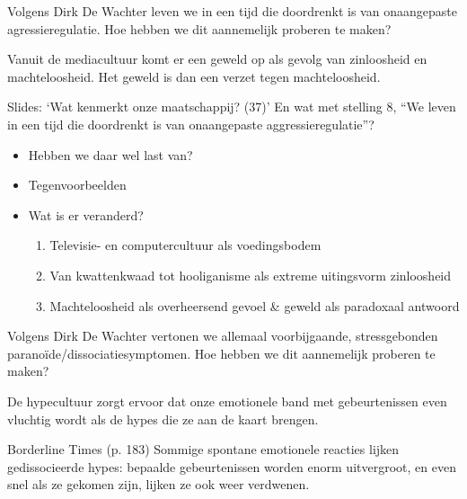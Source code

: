 \documentclass[main.tex]{subfiles}
\begin{document}
\begin{examenvraag}
    \begin{vraag}
        Volgens Dirk De Wachter leven we in een tijd die doordrenkt is van onaangepaste agressieregulatie. Hoe hebben we dit aannemelijk proberen te maken?
    \end{vraag}

    \begin{antwoord}
        Vanuit de mediacultuur komt er een geweld op als gevolg van zinloosheid en machteloosheid.
        Het geweld is dan een verzet tegen machteloosheid.
        \begin{citaat}{Slides: `Wat kenmerkt onze maatschappij? (37)'}
            En wat met stelling 8, ``We leven in een tijd die doordrenkt is van onaangepaste aggressieregulatie''?
            \begin{itemize}
                \item Hebben we daar wel last van?
                \item Tegenvoorbeelden
                \item Wat is er veranderd?
                    \begin{enumerate}
                        \item Televisie- en computercultuur als voedingsbodem
                        \item Van kwattenkwaad tot hooliganisme als extreme uitingsvorm zinloosheid
                        \item Machteloosheid als overheersend gevoel \& geweld als paradoxaal antwoord
                    \end{enumerate}
            \end{itemize}
        \end{citaat}
    \end{antwoord}
\end{examenvraag}


\begin{examenvraag}
    \begin{vraag}
        Volgens Dirk De Wachter vertonen we allemaal voorbijgaande, stressgebonden paranoïde/dissociatiesymptomen. Hoe hebben we dit aannemelijk proberen te maken?
    \end{vraag}

    \begin{antwoord}
        De hypecultuur zorgt ervoor dat onze emotionele band met gebeurtenissen even vluchtig wordt als de hypes die ze aan de kaart brengen.
        \begin{citaat}{Borderline Times (p. 183)}
            Sommige spontane emotionele reacties lijken gedissocieerde hypes: bepaalde gebeurtenissen worden enorm uitvergroot, en even snel als ze gekomen zijn, lijken ze ook weer verdwenen.
        \end{citaat}
    \end{antwoord}
\end{examenvraag}
\end{document}
